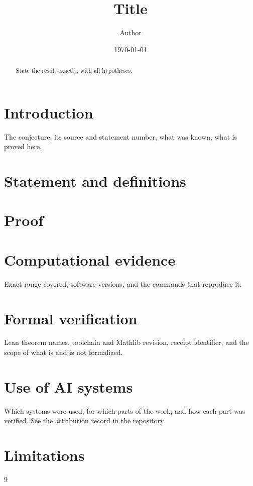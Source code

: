 \documentclass[11pt]{amsart}
\title{Title}
\author{Author}
\date{\today}
\theoremstyle{definition}
\theoremstyle{remark}
\begin{document}
\begin{abstract}
State the result exactly, with all hypotheses.
\end{abstract}

\maketitle

\section{Introduction}
The conjecture, its source and statement number, what was known, what is proved here.

\section{Statement and definitions}

\section{Proof}

\section{Computational evidence}
Exact range covered, software versions, and the commands that reproduce it.

\section{Formal verification}
Lean theorem names, toolchain and Mathlib revision, receipt identifier, and the
scope of what is and is not formalized.

\section*{Use of AI systems}
Which systems were used, for which parts of the work, and how each part was
verified. See the attribution record in the repository.

\section*{Limitations}

\begin{thebibliography}{9}
\end{thebibliography}
\end{document}
